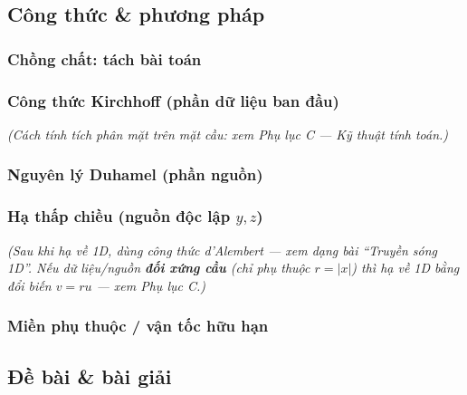 \subsection*{Công thức \& phương pháp}

\subsubsection*{Chồng chất: tách bài toán}


\subsubsection*{Công thức Kirchhoff (phần dữ liệu ban đầu)}

\emph{(Cách tính tích phân mặt trên mặt cầu: xem Phụ lục C --- Kỹ thuật tính toán.)}

\subsubsection*{Nguyên lý Duhamel (phần nguồn)}


\subsubsection*{Hạ thấp chiều (nguồn độc lập $y,z$)}

\emph{(Sau khi hạ về 1D, dùng công thức d'Alembert --- xem dạng bài ``Truyền sóng 1D''. Nếu dữ liệu/nguồn
\textbf{đối xứng cầu} (chỉ phụ thuộc $r=|x|$) thì hạ về 1D bằng đổi biến $v=ru$ --- xem Phụ lục C.)}

\subsubsection*{Miền phụ thuộc / vận tốc hữu hạn}



\subsection*{Đề bài \& bài giải}

